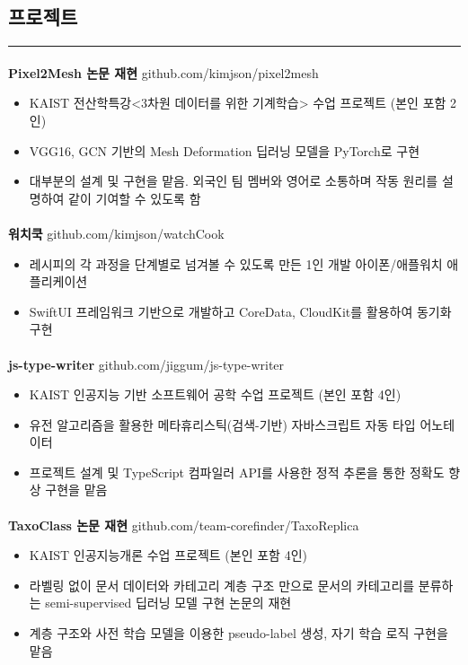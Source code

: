 \documentclass{article}
\begin{document}
\begin{center}
    \section*{프로젝트}
\end{center}
\hrule
\paragraph{\newline \newline}
\textbf{Pixel2Mesh 논문 재현} \hfill github.com/kimjson/pixel2mesh
\begin{itemize}
    \setlength\itemsep{0.1em}
    \item KAIST 전산학특강<3차원 데이터를 위한 기계학습> 수업 프로젝트 (본인 포함 2인)
    \item VGG16, GCN 기반의 Mesh Deformation 딥러닝 모델을 PyTorch로 구현
    \item 대부분의 설계 및 구현을 맡음. 외국인 팀 멤버와 영어로 소통하며 작동 원리를 설명하여 같이 기여할 수 있도록 함
\end{itemize}
\paragraph{}
\textbf{워치쿡} \hfill github.com/kimjson/watchCook
\begin{itemize}
    \setlength\itemsep{0.1em}
    \item 레시피의 각 과정을 단계별로 넘겨볼 수 있도록 만든 1인 개발 아이폰/애플워치 애플리케이션
    \item SwiftUI 프레임워크 기반으로 개발하고 CoreData, CloudKit를 활용하여 동기화 구현
\end{itemize}
\paragraph{}
\textbf{js-type-writer} \hfill github.com/jiggum/js-type-writer
\begin{itemize}
    \setlength\itemsep{0.1em}
    \item KAIST 인공지능 기반 소프트웨어 공학 수업 프로젝트 (본인 포함 4인)
    \item 유전 알고리즘을 활용한 메타휴리스틱(검색-기반) 자바스크립트 자동 타입 어노테이터
    \item 프로젝트 설계 및 TypeScript 컴파일러 API를 사용한 정적 추론을 통한 정확도 향상 구현을 맡음
\end{itemize}
\paragraph{}
\textbf{TaxoClass 논문 재현} \hfill github.com/team-corefinder/TaxoReplica
\begin{itemize}
    \setlength\itemsep{0.1em}
    \item KAIST 인공지능개론 수업 프로젝트 (본인 포함 4인)
    \item 라벨링 없이 문서 데이터와 카테고리 계층 구조 만으로 문서의 카테고리를 분류하는 semi-supervised 딥러닝 모델 구현 논문의 재현
    \item 계층 구조와 사전 학습 모델을 이용한 pseudo-label 생성, 자기 학습 로직 구현을 맡음
\end{itemize}
\end{document}
